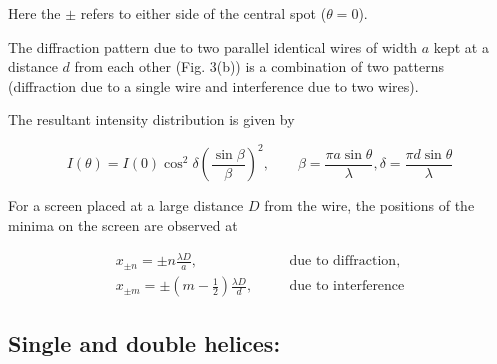 Here the $\pm$ refers to either side of the central spot ($\theta = 0$).

The diffraction pattern due to two parallel identical wires of width $a$ kept at a distance $d$ from each other (Fig. 3(b)) is a combination of two patterns (diffraction due to a single wire and interference due to two wires).

The resultant intensity distribution is given by   

\begin{equation}
    I(\theta) = I(0) \cos^2\delta \left( \frac{\sin \beta}{\beta} \right)^2, \quad \quad  \beta = \frac{\pi a \sin \theta}{\lambda}, \delta = \frac{\pi d \sin \theta}{\lambda}
\end{equation}

For a screen placed at a large distance $D$ from the wire, the positions of the minima on the screen are observed at 

\begin{equation*}
    \begin{aligned}
        x_{\pm n} = \pm n \frac{\lambda D}{a}, &\quad& \text{due to diffraction},\\
        x_{\pm m} = \pm \left( m - \frac{1}{2}\right) \frac{\lambda D}{d}, &\quad& \text{due to interference}
    \end{aligned}
\end{equation*}


\subsection*{Single and double helices:}
  
